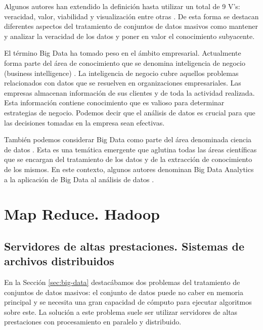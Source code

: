 \documentclass[10pt]{article}
\begin{document}
	Algunos autores han extendido la definición hasta utilizar un total de 9 V's: veracidad, valor, viabilidad y visualización entre otras \cite{understanding-big-data}. De esta forma se destacan diferentes aspectos del tratamiento de conjuntos de datos masivos como mantener y analizar la veracidad de los datos y poner en valor el conocimiento subyacente.

	El término Big Data ha tomado peso en el ámbito empresarial. Actualmente forma parte del área de conocimiento que se denomina inteligencia de negocio (business intelligence) \cite{business-intelligence}. La inteligencia de negocio cubre aquellos problemas relacionados con datos que se resuelven en organizaciones empresariales. Las empresas almacenan información de sus clientes y de toda la actividad realizada. Esta información contiene conocimiento que es valioso para determinar estrategias de negocio. Podemos decir que el análisis de datos es crucial para que las decisiones tomadas en la empresa sean efectivas. 

	También podemos considerar Big Data como parte del área denominada ciencia de datos \cite{data-science}. Esta es una temática emergente que aglutina todas las áreas científicas que se encargan del tratamiento de los datos y de la extracción de conocimiento de los mismos. En este contexto, algunos autores denominan Big Data Analytics a la aplicación de Big Data al análisis de datos \cite{big-data-trends}. 


\section{Map Reduce. Hadoop} \label{sec:map-reduce}


	\subsection{Servidores de altas prestaciones. Sistemas de archivos distribuidos}

		En la Sección \ref{sec:big-data} destacábamos dos problemas del tratamiento de conjuntos de datos masivos: el conjunto de datos puede no caber en memoria principal y se necesita una gran capacidad de cómputo para ejecutar algoritmos sobre este. La solución a este problema suele ser utilizar servidores de altas prestaciones con procesamiento en paralelo y distribuido.
	
\end{document}
